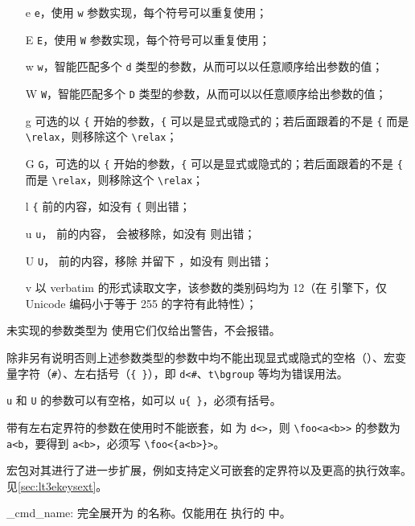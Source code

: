\documentclass[twoside]{book}
\begin{document}
{\begin{itemize}
  \item[\CCE e] \texttt e，使用 \texttt w 参数实现，每个符号可以重复使用；
  \item[\CCE E] \texttt E，使用 \texttt W 参数实现，每个符号可以重复使用；
  \item[\CCE w] \texttt w，智能匹配多个 \texttt d 类型的参数，从而可以以任意顺序给出参数的值；
  \item[\CCE W] \texttt W，智能匹配多个 \texttt D 类型的参数，从而可以以任意顺序给出参数的值；
  \item[\CCE g] 可选的以 \verb|{| 开始的参数，\verb|{| 可以是显式或隐式的；若后面跟着的不是 \verb|{| 而是 \verb|\relax|，则移除这个 \verb|\relax|；
  \item[\CCE G] \texttt G，可选的以 \verb|{| 开始的参数，\verb|{| 可以是显式或隐式的；若后面跟着的不是 \verb|{| 而是 \verb|\relax|，则移除这个 \verb|\relax|；
  \item[\CCS l] \verb|{| 前的内容，如没有 \verb|{| 则出错；
  \item[\CCS u] \texttt u， 前的内容， 会被移除，如没有  则出错；
  \item[\CCE U] \texttt U， 前的内容，移除  并留下 ，如没有  则出错；
  \item[\CCS v] 以 verbatim 的形式读取文字，该参数的类别码均为 12（在 \pupTeX 引擎下，仅 Unicode 编码小于等于 255 的字符有此特性）；
\end{itemize}
}

未实现的参数类型为  使用它们仅给出警告，不会报错。

除非另有说明否则上述参数类型的参数中均不能出现显式或隐式的空格（\texttt\textvisiblespace）、宏变量字符（\texttt\#）、左右括号（\texttt{\{ \}}），即 \verb|d<#|、\verb|t\bgroup| 等均为错误用法。

\texttt u 和 \texttt U 的参数可以有空格，如可以 \verb|u{ }|，必须有括号。

带有左右定界符的参数在使用时不能嵌套，如  为 \verb|d<>|，则 \verb|\foo<a<b>>|
的参数为 \verb|a<b|，要得到 \verb|a<b>|，必须写 \verb|\foo<{a<b>}>|。

 宏包对其进行了进一步扩展，例如支持定义可嵌套的定界符以及更高的执行效率。见\cref{sec:lt3ekeysext}。

\begin{function}[EXP]{\ekeys_cmd_name:}
完全展开为  的名称。仅能用在  执行的  中。
\end{function}
\end{document}
